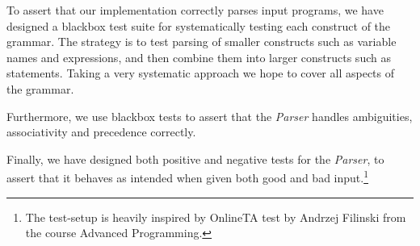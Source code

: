 To assert that our implementation correctly parses input programs, we have designed a blackbox test suite for systematically testing each construct of the grammar.
The strategy is to test parsing of smaller constructs such as variable names and expressions, and then combine them into larger constructs such as statements.
Taking a very systematic approach we hope to cover all aspects of the grammar.

Furthermore, we use blackbox tests to assert that the \textit{Parser} handles ambiguities, associativity and precedence correctly.

Finally, we have designed both positive and negative tests for the \textit{Parser}, to assert that it behaves as intended when given both good and bad input.\footnote{The test-setup is heavily inspired by OnlineTA test by Andrzej Filinski from the course Advanced Programming.}
